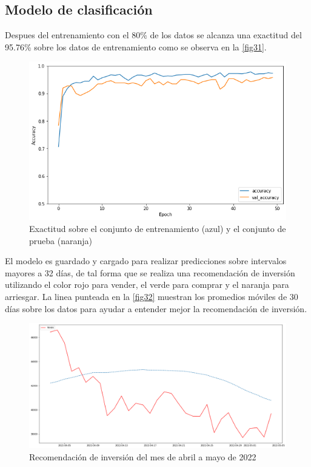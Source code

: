 \subsection{Modelo de clasificación}

Despues del entrenamiento con el 80\% de los datos se alcanza una exactitud del 95.76\% sobre los datos de entrenamiento como se observa en la \autoref{fig31}.

\begin{figure}[h!]
	\centering
	\includegraphics[scale=0.6]{Chapter5/exactitud_clas.png}
	\caption{Exactitud sobre el conjunto de entrenamiento (azul) y el conjunto de prueba (naranja)}
	\label{fig31}
\end{figure}

El modelo es guardado y cargado para realizar predicciones sobre intervalos mayores a 32 días, de tal forma que se realiza una recomendación de inversión utilizando el color rojo para vender, el verde para comprar y el naranja para arriesgar. La linea punteada en la \autoref{fig32} muestran los promedios móviles de 30 días sobre los datos para ayudar a entender mejor la recomendación de inversión. 

\begin{figure}[h!]
	\centering
	\includegraphics[scale=0.4]{Chapter5/reco.png}
	\caption{Recomendación de inversión del mes de abril a mayo de 2022}
	\label{fig32}
\end{figure}

